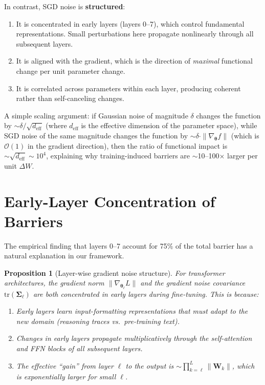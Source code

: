 \documentclass{article}
\newtheorem{proposition}{Proposition}
\newcommand{\btheta}{\boldsymbol{\theta}}
\newcommand{\bSigma}{\boldsymbol{\Sigma}}
\begin{document}
In contrast, SGD noise is \textbf{structured}:
\begin{enumerate}
\item It is concentrated in early layers (layers 0--7), which control
      fundamental representations.  Small perturbations here propagate
      nonlinearly through all subsequent layers.
\item It is aligned with the gradient, which is the direction of
      \emph{maximal} functional change per unit parameter change.
\item It is correlated across parameters within each layer, producing
      coherent rather than self-canceling changes.
\end{enumerate}

A simple scaling argument: if Gaussian noise of magnitude $\delta$ changes
the function by $\sim \delta/\sqrt{d_{\text{eff}}}$ (where $d_{\text{eff}}$
is the effective dimension of the parameter space), while SGD noise of the
same magnitude changes the function by $\sim \delta \cdot \|\nabla_\btheta f\|$
(which is $\mathcal{O}(1)$ in the gradient direction), then the ratio of
functional impact is $\sim \sqrt{d_{\text{eff}}} \sim 10^4$, explaining why
training-induced barriers are $\sim$10--100$\times$ larger per unit $\Delta W$.

\section{Early-Layer Concentration of Barriers}

The empirical finding that layers 0--7 account for 75\% of the total barrier
has a natural explanation in our framework.

\begin{proposition}[Layer-wise gradient noise structure]
For transformer architectures, the gradient norm $\|\nabla_{\btheta_\ell} L\|$
and the gradient noise covariance $\mathrm{tr}(\bSigma_\ell)$ are both
concentrated in early layers during fine-tuning.  This is because:
\begin{enumerate}
\item Early layers learn input-formatting representations that must adapt
      to the new domain (reasoning traces vs.\ pre-training text).
\item Changes in early layers propagate multiplicatively through the
      self-attention and FFN blocks of all subsequent layers.
\item The effective ``gain'' from layer $\ell$ to the output is
      $\sim \prod_{k=\ell}^{L} \|\mathbf{W}_k\|$, which is exponentially
      larger for small $\ell$.
\end{enumerate}
\end{proposition}
\end{document}
